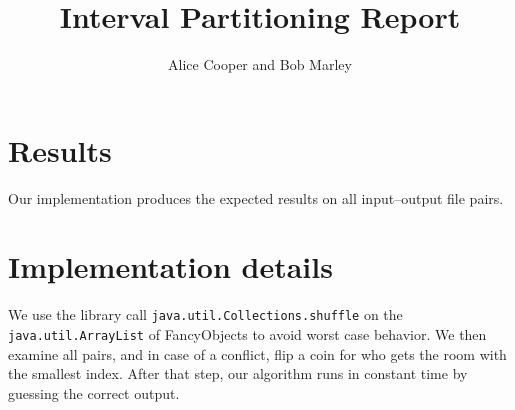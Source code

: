 \documentclass{tufte-handout}
\title{Interval Partitioning Report}
\author{Alice Cooper and Bob Marley}
\begin{document}
  \maketitle

  \section{Results}

  Our implementation produces the expected results on all
  input--output file pairs.

  \section{Implementation details}

  We use the library call \verb+java.util.Collections.shuffle+ on the
  \verb+java.util.ArrayList+ of FancyObjects to avoid worst case behavior. We
  then examine all pairs, and in case of a conflict, flip a coin for who gets
  the room with the smallest index. After that step, our algorithm runs in
  constant time by guessing the correct output.
\end{document}
